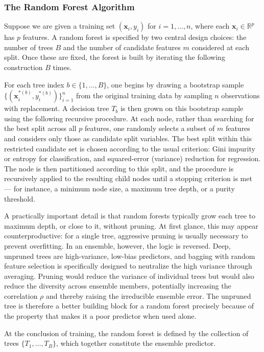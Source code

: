 \subsubsection*{The Random Forest Algorithm}

Suppose we are given a training set $(\mathbf{x}_i, y_i)$ for $i = 1, \ldots, n$, where each $\mathbf{x}_i \in \mathbb{R}^p$ has $p$ features. A random forest is specified by two central design choices: the number of trees $B$ and the number of candidate features $m$ considered at each split. Once these are fixed, the forest is built by iterating the following construction $B$ times.

For each tree index $b \in \{1, \ldots, B\}$, one begins by drawing a bootstrap sample $\{(\mathbf{x}_i^{*(b)}, y_i^{*(b)})\}_{i=1}^n$ from the original training data by sampling $n$ observations with replacement. A decision tree $T_b$ is then grown on this bootstrap sample using the following recursive procedure. At each node, rather than searching for the best split across all $p$ features, one \alert{randomly selects} a subset of $m$ features and considers only those as candidate split variables. The best split within this restricted candidate set is chosen according to the usual criterion: Gini impurity or entropy for classification, and squared-error (variance) reduction for regression. The node is then partitioned according to this split, and the procedure is recursively applied to the resulting child nodes until a stopping criterion is met --- for instance, a minimum node size, a maximum tree depth, or a purity threshold.

A practically important detail is that random forests typically grow each tree to maximum depth, or close to it, \alert{without pruning}. At first glance, this may appear counterproductive: for a single tree, aggressive pruning is usually necessary to prevent overfitting. In an ensemble, however, the logic is reversed. Deep, unpruned trees are high-variance, low-bias predictors, and bagging with random feature selection is specifically designed to neutralize the high variance through averaging. Pruning would reduce the variance of individual trees but would also reduce the diversity across ensemble members, potentially increasing the correlation $\rho$ and thereby raising the irreducible ensemble error. The unpruned tree is therefore a better building block for a random forest precisely because of the property that makes it a poor predictor when used alone.

At the conclusion of training, the random forest is defined by the collection of trees $\{T_1, \ldots, T_B\}$, which together constitute the ensemble predictor.


